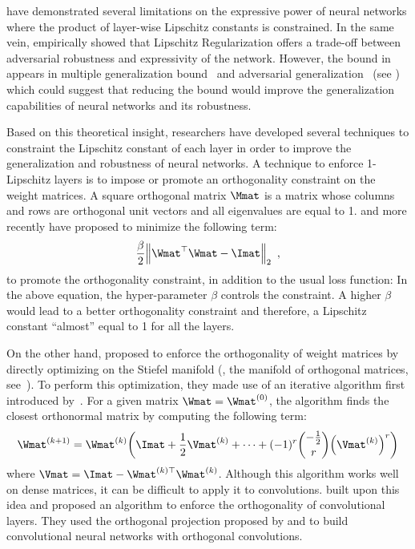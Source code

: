 \citet{huster2018limitations} have demonstrated several limitations on the expressive power of neural networks where the product of layer-wise Lipschitz constants is constrained.
In the same vein, \citet{couellan2019coupling} empirically showed that Lipschitz Regularization offers a trade-off between adversarial robustness and expressivity of the network.
However, the bound in  appears in multiple generalization bound~\cite{neyshabur2017,bartlett2017spectrally,golowich2018} and adversarial generalization~\cite{farnia2018generalizable} (see ) which could suggest that reducing the bound would improve the generalization capabilities of neural networks and its robustness.

Based on this theoretical insight, researchers have developed several techniques to constraint the Lipschitz constant of each layer in order to improve the generalization and robustness of neural networks.
A technique to enforce 1-Lipschitz layers is to impose or promote an orthogonality constraint on the weight matrices.
A square orthogonal matrix $\Mmat$ is a matrix whose columns and rows are orthogonal unit vectors and all eigenvalues are equal to 1.
\citet{cisse2017parseval} and more recently \citet{wang2020orthogonal,huang2020controllable} have proposed to minimize the following term:
\begin{equation} \label{equation:ch3-orthogonality_constraint}
  \frac{\beta}{2} \norm{\Wmat^\top \Wmat - \Imat}_2  \enspace, 
\end{equation}
to promote the orthogonality constraint, in addition to the usual loss function:
In the above equation, the hyper-parameter $\beta$ controls the constraint.
A higher $\beta$ would lead to a better orthogonality constraint and therefore, a Lipschitz constant ``almost'' equal to 1 for all the layers.

On the other hand, \citet{anil2019sorting} proposed to enforce the orthogonality of weight matrices by directly optimizing on the Stiefel
manifold (\ie, the manifold of orthogonal matrices, see~\citet{absil2009optimization}).
To perform this optimization, they made use of an iterative algorithm first introduced by~\citet{bjorck1971iterative}.
For a given matrix $\Wmat = \Wmat^{(0)}$, the algorithm finds the closest orthonormal matrix by computing the following term:
\begin{equation}
  \Wmat^{(k+1)} = \Wmat^{(k)} \left( \Imat + \frac{1}{2} \Vmat^{(k)} + \cdots + (-1)^r {-\frac{1}{2} \choose r}  \left(\Vmat^{(k)}\right)^r \right)
\end{equation}
where $\Vmat = \Imat - \Wmat^{(k)\top} \Wmat^{(k)}$.
Although this algorithm works well on dense matrices, it can be difficult to apply it to convolutions. 
\citet{li2019preventing} built upon this idea and proposed an algorithm to enforce the orthogonality of convolutional layers.
They used the orthogonal projection proposed by \citet{kautsky1994matrix} and \citet{xiao2018dynamical} to build convolutional neural networks with orthogonal convolutions.

